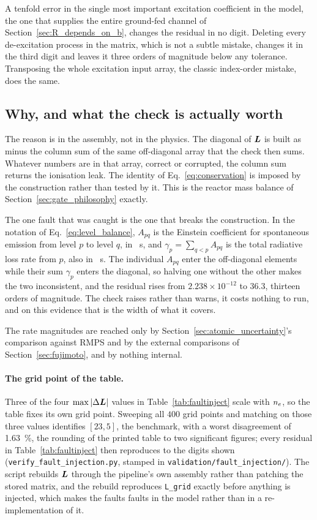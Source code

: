 A tenfold error in the single most important excitation coefficient in the
model, the one that supplies the entire ground-fed channel of
Section~\ref{sec:R_depends_on_b}, changes the residual in no digit. Deleting
every de-excitation process in the matrix, which is not a subtle mistake,
changes it in the third digit and leaves it three orders of magnitude below any
tolerance. Transposing the whole excitation input array, the classic
index-order mistake, does the same.

\subsection{Why, and what the check is actually worth}

The reason is in the assembly, not in the physics. The diagonal of $\bm{L}$ is
built as minus the column sum of the same off-diagonal array that the check
then sums. Whatever numbers are in that array, correct or corrupted, the column
sum returns the ionisation leak. The identity of Eq.~\eqref{eq:conservation} is
imposed by the construction rather than tested by it. This is the reactor mass
balance of Section~\ref{sec:gate_philosophy} exactly.

The one fault that was caught is the one that breaks the construction. In the
notation of Eq.~\eqref{eq:level_balance}, $A_{pq}$ is the Einstein coefficient
for spontaneous emission from level $p$ to level $q$, in \si{\per\second}, and
$\gamma_p = \sum_{q<p} A_{pq}$ is the total radiative loss rate from $p$, also in
\si{\per\second}. The individual $A_{pq}$ enter the off-diagonal elements while
their sum $\gamma_p$ enters the diagonal, so halving one without the other makes
the two inconsistent, and the residual rises from $2.238\times10^{-12}$ to
$36.3$, thirteen orders of magnitude. The check raises rather than warns, it
costs nothing to run, and on this evidence that is the width of what it covers.

The rate magnitudes are reached only by Section~\ref{sec:atomic_uncertainty}'s
comparison against RMPS and by the external comparisons of
Section~\ref{sec:fujimoto}, and by nothing internal.

\paragraph{The grid point of the table.} Three of the four
$\max|\Delta\bm{L}|$ values in Table~\ref{tab:faultinject} scale with $n_e$, so
the table fixes its own grid point. Sweeping all $400$ grid points and matching on those three values
identifies $[23,5]$, the benchmark, with a worst disagreement of
\SI{1.63}{\percent}, the rounding of the printed table to two significant
figures; every residual in Table~\ref{tab:faultinject} then reproduces to the
digits shown (\texttt{verify\_fault\_injection.py}, stamped in
\texttt{validation/fault\_injection/}). The script rebuilds $\bm{L}$ through the
pipeline's own assembly rather than patching the stored matrix, and the rebuild
reproduces \texttt{L\_grid} exactly before anything is injected, which makes the
faults faults in the model rather than in a re-implementation of it.

